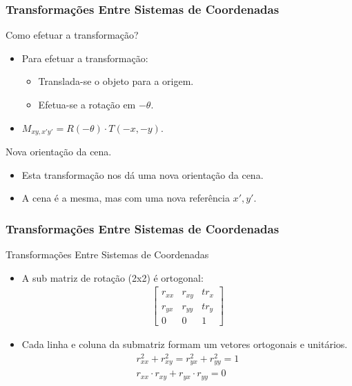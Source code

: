 \documentclass{beamer}
\begin{document}
\begin{frame}
\frametitle{Transformações Entre Sistemas de Coordenadas}

	\begin{block}{Como efetuar a transformação?}
		\begin{itemize}
			\item Para efetuar a transformação:
				\begin{itemize}
					\item Translada-se o objeto para a origem.
					\item Efetua-se a rotação em $ -\theta$.					
				\end{itemize}
			\item $M_{xy,x'y'} = R(- \theta) \cdot T(-x,-y)$.
		\end{itemize}
	\end{block}
	
	\begin{block}{Nova orientação da cena.}
		\begin{itemize}
			\item Esta transformação nos dá uma nova orientação da cena.
			\item A cena é a mesma, mas com uma nova referência $x',y'$.
		\end{itemize}
	\end{block}
		
\end{frame}


\begin{frame}
\frametitle{Transformações Entre Sistemas de Coordenadas}

	\begin{block}{Transformações Entre Sistemas de Coordenadas}
		\begin{itemize}
			\item A sub matriz de rotação (2x2) é ortogonal:
				\begin{eqnarray*}
					\begin{bmatrix}
						r_{xx} & r_{xy} & tr_{x} \\
						r_{yx} & r_{yy} & tr_{y} \\
						0 & 0 & 1 
					\end{bmatrix}
				\end{eqnarray*}
			\item Cada linha e coluna da submatriz formam um vetores ortogonais e unitários.\\
			\begin{eqnarray*}
				r_{xx}^2 + r_{xy}^2 = r_{yx}^2 + r_{yy}^2 = 1 \\
				r_{xx} \cdot r_{xy} + r_{yx} \cdot r_{yy} = 0
			\end{eqnarray*}
		\end{itemize}
	\end{block}

\end{frame}
\end{document}

